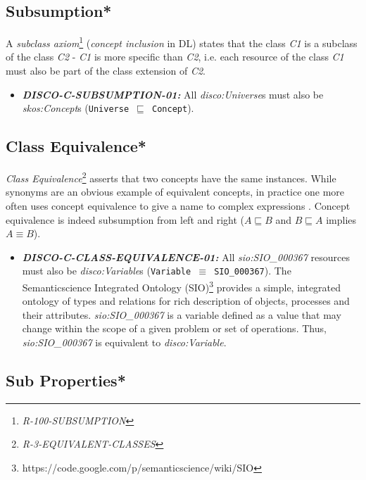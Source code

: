 \documentclass{llncs}
\newcommand{\ms}[1]{\texttt{#1}}
\begin{document}
\subsection{Subsumption*}

A \emph{subclass axiom}\footnote{{\em R-100-SUBSUMPTION}} ({\em concept inclusion} in DL) states that the class \emph{C1} is a subclass of the class \emph{C2} - \emph{C1} is more specific than \emph{C2}, 
i.e. each resource of the class \emph{C1} must also be part of the class extension of \emph{C2}.

\begin{itemize}
	\item \textbf{{\em DISCO-C-SUBSUMPTION-01:}} 
All {\em disco:Universe}s must also be {\em skos:Concept}s (\ms{Universe $\sqsubseteq$ Concept}).
\end{itemize}

\subsection{Class Equivalence*}

{\em Class Equivalence}\footnote{{\em R-3-EQUIVALENT-CLASSES}} asserts that two concepts have the same instances.
While synonyms are an obvious example of equivalent concepts, in practice one more
often uses concept equivalence to give a name to complex expressions \cite{Kroetzsch2012}.
Concept equivalence is indeed subsumption from left and right ($A \sqsubseteq B$ and $B \sqsubseteq A$ implies $A \equiv B$).

\begin{itemize}
	\item \textbf{{\em DISCO-C-CLASS-EQUIVALENCE-01:}}
All {\em sio:SIO\_000367} resources must also be {\em disco:Variable}s (\ms{Variable $\equiv$ SIO\_000367}).
The Semanticscience Integrated Ontology (SIO)\footnote{https://code.google.com/p/semanticscience/wiki/SIO} provides a simple, integrated ontology of types and relations for rich description of objects, processes and their attributes.
{\em sio:SIO\_000367} is a variable defined as a value that may change within the scope of a given problem or set of operations.
Thus, {\em sio:SIO\_000367} is equivalent to {\em disco:Variable}.
\end{itemize}

\subsection{Sub Properties*}
\end{document}
